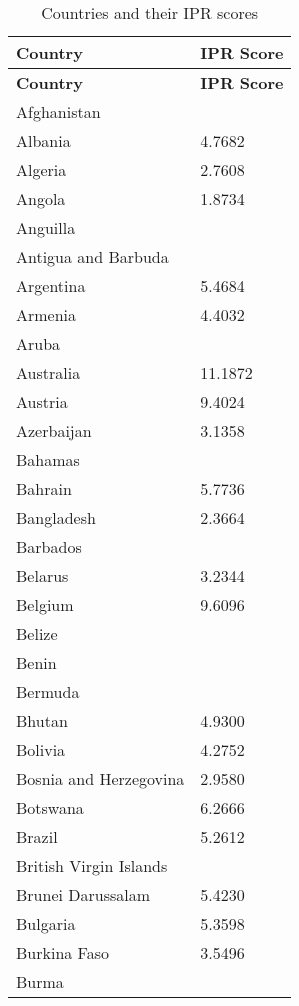 \documentclass[12pt]{article}
\begin{document}
\begin{longtable}{|p{}|p{}|}
\caption{Countries and their IPR scores \citep{Lesser2010}\label{long}}\\
 
 \hline\textbf{Country}&\textbf{IPR Score}\\\hline
 \endfirsthead
 
 \hline\textbf{Country}&\textbf{IPR Score}\\\hline
 \endhead
 
 \hline
 \endfoot
 
 \hline
 \endlastfoot
Afghanistan& \\\hline
Albania&4.7682 \\\hline
Algeria&2.7608 \\\hline
Angola&1.8734 \\\hline
Anguilla& \\\hline
Antigua and Barbuda& \\\hline
Argentina&5.4684 \\\hline
Armenia&4.4032 \\\hline
Aruba& \\\hline
Australia&11.1872 \\\hline
Austria&9.4024 \\\hline
Azerbaijan&3.1358 \\\hline
Bahamas& \\\hline
Bahrain&5.7736 \\\hline
Bangladesh&2.3664 \\\hline
Barbados& \\\hline
Belarus&3.2344 \\\hline
Belgium&9.6096 \\\hline
Belize& \\\hline
Benin& \\\hline
Bermuda& \\\hline
Bhutan&4.9300 \\\hline
Bolivia&4.2752 \\\hline
Bosnia and Herzegovina&2.9580 \\\hline
Botswana&6.2666 \\\hline
Brazil&5.2612 \\\hline
British Virgin Islands& \\\hline
Brunei Darussalam&5.4230 \\\hline
Bulgaria&5.3598 \\\hline
Burkina Faso&3.5496 \\\hline
Burma& \\\hline

\end{longtable}
\end{document}
